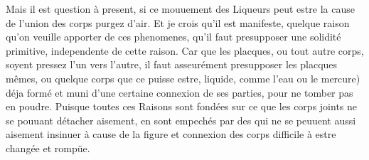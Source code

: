 
\pstart  
Mais il est question \`{a} present, si ce mouuement des Liqueurs peut estre la cause de l'union des corps purgez\protect{} d'air. Et je crois qu'il est manifeste, quelque raison  qu'on veuille apporter de ces phenomenes, qu'il faut presupposer  une solidit\'{e} primitive, independente de cette raison. Car  que les placques, ou tout autre corps, soyent pressez l'un vers l'autre, il faut asseur\'{e}ment presupposer les placques m\^{e}mes, ou quelque corps que ce puisse estre,  liquide, comme l'eau ou le mercure\protect{}) d\'{e}ja form\'{e} et muni d'une certaine  connexion de ses parties, pour ne tomber pas en poudre. Puisque toutes ces Raisons sont fond\'{e}es sur ce que les corps joints ne se pouuant d\'{e}tacher aisement,  en sont empech\'{e}s par des  qui ne se peuuent aussi aisement  insinuer \`{a} cause de la figure et connexion des corps  difficile \`{a} estre chang\'{e}e et romp\"{u}e. 
\pend 
